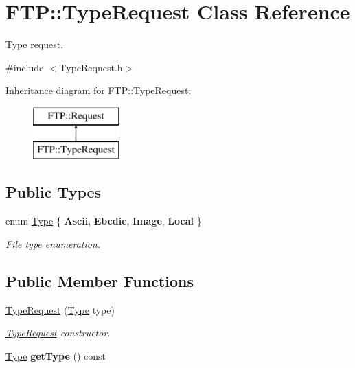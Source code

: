 \hypertarget{classFTP_1_1TypeRequest}{}\section{F\+T\+P\+:\+:Type\+Request Class Reference}
\label{classFTP_1_1TypeRequest}


Type request.  




{\ttfamily \#include $<$Type\+Request.\+h$>$}

Inheritance diagram for F\+T\+P\+:\+:Type\+Request\+:\begin{figure}[H]
\begin{center}
\leavevmode
\includegraphics[height=2.000000cm]{classFTP_1_1TypeRequest}
\end{center}
\end{figure}
\subsection*{Public Types}
\begin{DoxyCompactItemize}
\item 
\hypertarget{classFTP_1_1TypeRequest_a504950a6fadf9efc043b6819170fca40}{}enum \hyperlink{classFTP_1_1TypeRequest_a504950a6fadf9efc043b6819170fca40}{Type} \{ {\bfseries Ascii}, 
{\bfseries Ebcdic}, 
{\bfseries Image}, 
{\bfseries Local}
 \}\label{classFTP_1_1TypeRequest_a504950a6fadf9efc043b6819170fca40}

\begin{DoxyCompactList}\small\item\em File type enumeration. \end{DoxyCompactList}\end{DoxyCompactItemize}
\subsection*{Public Member Functions}
\begin{DoxyCompactItemize}
\item 
\hyperlink{classFTP_1_1TypeRequest_a9583c30f4e96a6a76afe3c8864c7ad32}{Type\+Request} (\hyperlink{classFTP_1_1TypeRequest_a504950a6fadf9efc043b6819170fca40}{Type} type)
\begin{DoxyCompactList}\small\item\em \hyperlink{classFTP_1_1TypeRequest}{Type\+Request} constructor. \end{DoxyCompactList}\item 
\hypertarget{classFTP_1_1TypeRequest_a35f4fa506d33c326f6ee69435491f70f}{}\hyperlink{classFTP_1_1TypeRequest_a504950a6fadf9efc043b6819170fca40}{Type} {\bfseries get\+Type} () const \label{classFTP_1_1TypeRequest_a35f4fa506d33c326f6ee69435491f70f}

\end{DoxyCompactItemize}
